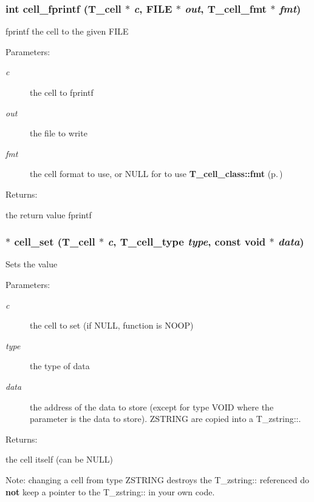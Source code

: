 \subsubsection{\setlength{\rightskip}{0pt plus 5cm}int cell\_\-fprintf ({\bf T\_\-cell} $\ast$ {\em c}, FILE $\ast$ {\em out}, {\bf T\_\-cell\_\-fmt} $\ast$ {\em fmt})}\label{group__table__cell_a5}


fprintf the cell to the given FILE\begin{Desc}
\item[Parameters: ]\par
\begin{description}
\item[{\em 
c}]the cell to fprintf \item[{\em 
out}]the file to write \item[{\em 
fmt}]the cell format to use, or NULL for to use {\bf T\_\-cell\_\-class::fmt} {\rm (p.\,\pageref{structS__cell__class_m0})} \end{description}
\end{Desc}
\begin{Desc}
\item[Returns: ]\par
the return value fprintf \end{Desc}
\subsubsection{$\ast$ cell\_\-set ({\bf T\_\-cell} $\ast$ {\em c}, {\bf T\_\-cell\_\-type} {\em type}, const void $\ast$ {\em data})}\label{group__table__cell_a4}


Sets the value\begin{Desc}
\item[Parameters: ]\par
\begin{description}
\item[{\em 
c}]the cell to set (if NULL, function is NOOP) \item[{\em 
type}]the type of data \item[{\em 
data}]the address of the data to store (except for type VOID where the parameter is the data to store). ZSTRING are copied into a T\_\-zstring::. \end{description}
\end{Desc}
\begin{Desc}
\item[Returns: ]\par
the cell itself (can be NULL)\end{Desc}
Note: changing a cell from type ZSTRING destroys the T\_\-zstring:: referenced do {\bf not} keep a pointer to the T\_\-zstring:: in your own code. 
